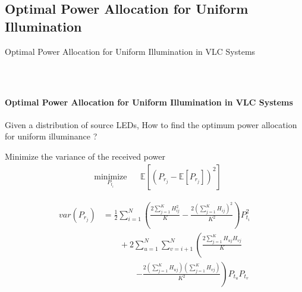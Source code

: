 \documentclass[slidestop,usepdftitle=false]{gvvslides}
\providecommand{\sbrak}[1]{\ensuremath{{}\left[#1\right]}}
\providecommand{\brak}[1]{\ensuremath{\left(#1\right)}}
\providecommand{\lbrak}[1]{\ensuremath{\left(#1\right.}}
\providecommand{\rbrak}[1]{\ensuremath{\left.#1\right)}}
\begin{document}
\subsection{Optimal Power Allocation for Uniform Illumination}
\begin{frame}
\centering
\vfill
Optimal Power Allocation for Uniform Illumination in VLC Systems
\vfill
\end{frame}
\begin{frame}
\frametitle{\,}
\framesubtitle{Optimal Power Allocation for Uniform Illumination in VLC Systems}
\begin{list}{}{}
\vfill
\item<1-> Given a distribution of source LEDs, How to find the optimum power allocation for uniform illuminance ?  \\ 
\vfill
\vspace{.2in}
\item<2-> Minimize the variance of the received power
\begin{equation}
\begin{aligned}
& \underset{P_{t_i}}{\text{minimize}}
& & \mathbb{E}\sbrak{\brak{P_{r_j}-\mathbb{E}\sbrak{P_{r_j}}}^2} \nonumber
\end{aligned}
\end{equation}
\vfill
\item<3-> 
\footnotesize{
\begin{align}
var(P_{r_j})&=\frac{1}{2}\sum_{i=1}^N \brak{\frac{2\sum_{j=1}^KH_{ij}^2}{K}-\frac{2\brak{\sum_{j=1}^KH_{ij}}^2}{K^2}} P_{t_i}^2 \nonumber \\
            &\qquad + 2 \sum_{u=1}^N \sum_{v=i+1}^{N} \lbrak{\frac{2\sum_{j=1}^KH_{uj}H_{vj}}{K} } \nonumber \\
             &\qquad\qquad \rbrak{-\frac{2\brak{\sum_{j=1}^KH_{uj}}\brak{\sum_{j=1}^KH_{vj}}}{K^2}} P_{t_u}P_{t_v} \nonumber
\end{align}
}
\vfill
\end{list} 
\end{frame}
\end{document}
